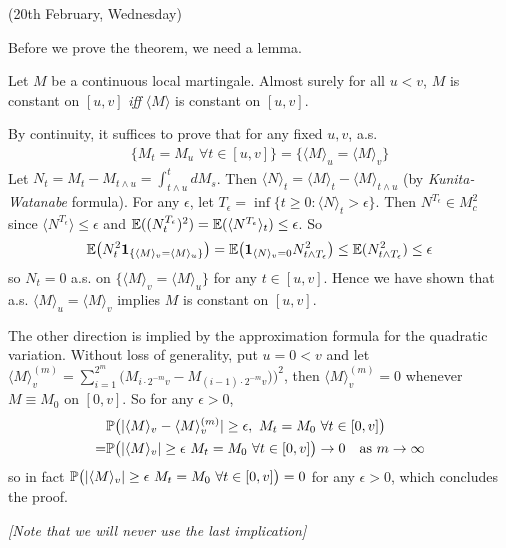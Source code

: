 \documentclass[10pt,a4paper]{article}
\newenvironment{proof}
{\begin{changemargin}{0.5cm}{0.5cm} 
	}%
	{\end{changemargin}
}
\newenvironment{p}
{\begin{proof} 
	}%
	{\end{proof}
}
\begin{document}
\newday

(20th February, Wednesday)
\s

Before we prove the theorem, we need a lemma. 
\s

\lem Let $M$ be a continuous local martingale. Almost surely for all $u<v$, $M$ is constant on $[u,v]$ \emph{iff} $\langle M \rangle$ is constant on $[u,v]$.
\begin{p}
\pf By continuity, it suffices to prove that for any fixed $u, v$, a.s.
\begin{align*}
\{ M_t = M_u \,\, \forall t\in [u,v] \} = \{ \langle M \rangle_u = \langle M \rangle_v \}
\end{align*}
Let $N_t = M_t - M_{t\wedge u} = \int_{t\wedge u}^t dM_s$. Then $\langle N \rangle_t = \langle M \rangle_t - \langle M \rangle_{t\wedge u}$ (by \emph{Kunita-Watanabe} formula). For any $\epsilon$, let $T_{\epsilon} = \inf \{t\geq 0 : \langle N \rangle_t > \epsilon \}$. Then $N^{T_{\epsilon}} \in M_c^2$ since $\langle N^{T_{\epsilon}} \rangle \leq \epsilon$ and $\mathbb{E}((N_t^{T_{\epsilon}})^2) = \mathbb{E} (\langle N^{T_{\epsilon}} \rangle_{t}) \leq \epsilon$. So 
\begin{align*}
\mathbb{E} \big( N_t^2 \bm{1}_{\{\langle M \rangle_v =\langle M \rangle_u \}} \big) = \mathbb{E} \big( \bm{1}_{\langle N \rangle_v =0} N_{t\wedge T_{\epsilon}}^2 \big) \leq \mathbb{E} (N^2_{t\wedge T_{\epsilon}}) \leq \epsilon
\end{align*}
so $N_t =0$ a.s. on $\{\langle M \rangle_v = \langle M \rangle_u \}$ for any $t\in [u,v]$. Hence we have shown that a.s. $\langle M \rangle_u = \langle M \rangle_v$ implies $M$ is constant on $[u,v]$.
\s

The other direction is implied by the approximation formula for the quadratic variation. Without loss of generality, put $u=0 < v$ and let $\langle M \rangle^{(m)}_v = \sum_{i=1}^{2^m} \big( M_{i\cdot 2^{-m}v} - M_{(i-1)\cdot 2^{-m}v}) \big)^2$, then $\langle M \rangle^{(m)}_v =0$ whenever $M \equiv M_0$ on $[0,v]$. So for any $\epsilon>0$,
\begin{align*}
&\mathbb{P} \big(  | \langle M \rangle_v - \langle M \rangle_v^{(m)} | \geq \epsilon, \,\, M_t =M_0\,\, \forall t\in[0,v] \big) \\
=& \mathbb{P} \big( |\langle M \rangle_v| \geq \epsilon \,\, M_t =M_0\,\, \forall t\in[0,v] \big) \rightarrow 0 \quad \text{as } m \rightarrow \infty
\end{align*}
so in fact $\mathbb{P} \big( |\langle M \rangle_v| \geq \epsilon \,\, M_t =M_0\,\, \forall t\in[0,v] \big) =0$ for any $\epsilon >0$, which concludes the proof.
 
\emph{[Note that we will never use the last implication]}

\eop
\end{p}
\end{document}
